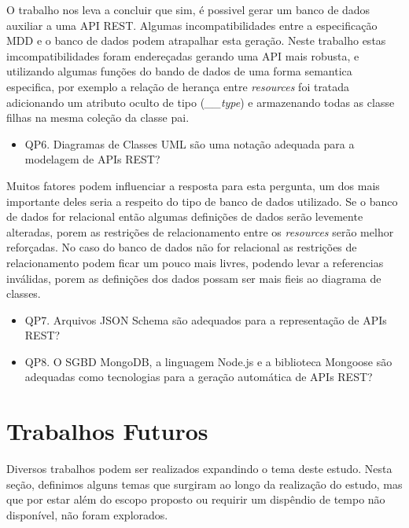 O trabalho nos leva a concluir que sim, é possivel gerar um banco de dados auxiliar a uma API REST. Algumas incompatibilidades entre a especificação MDD e o banco de dados podem atrapalhar esta geração. Neste trabalho estas imcompatibilidades foram endereçadas gerando uma API mais robusta, e utilizando algumas funções do bando de dados de uma forma semantica especifica, por exemplo a relação de herança entre \textit{resources} foi tratada adicionando um atributo oculto de tipo (\textit{\_\_type}) e armazenando todas as classe filhas na mesma coleção da classe pai.

\begin{itemize}
	\item QP6. Diagramas de Classes UML são uma notação adequada para a modelagem de APIs REST?
\end{itemize}

Muitos fatores podem influenciar a resposta para esta pergunta, um dos mais importante deles seria a respeito do tipo de banco de dados utilizado. Se o banco de dados for relacional então algumas definições de dados serão levemente alteradas, porem as restrições de relacionamento entre os \textit{resources} serão melhor reforçadas. No caso do banco de dados não for relacional as restrições de relacionamento podem ficar um pouco mais livres, podendo levar a referencias inválidas, porem as definições dos dados possam ser mais fieis ao diagrama de classes.

\begin{itemize}
	\item QP7. Arquivos JSON Schema são adequados para a representação de APIs REST?
\end{itemize}

\begin{itemize}
	\item QP8. O SGBD MongoDB, a linguagem Node.js e a biblioteca Mongoose são adequadas como tecnologias para a geração automática de APIs REST?
\end{itemize}


\section{Trabalhos Futuros}

Diversos trabalhos podem ser realizados expandindo o tema deste estudo. Nesta seção, definimos alguns temas que surgiram ao longo da realização do estudo, mas que por estar além do escopo proposto ou requirir um dispêndio de tempo não disponível, não foram explorados.

